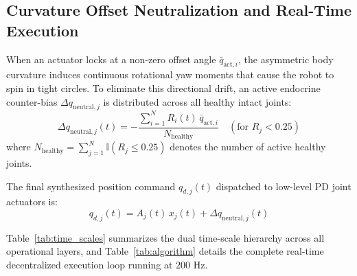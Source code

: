 \documentclass{iopjournal}
\begin{document}
\subsection{Curvature Offset Neutralization and Real-Time Execution}
When an actuator locks at a non-zero offset angle $\bar{q}_{\text{act},i}$, the asymmetric body curvature induces continuous rotational yaw moments that cause the robot to spin in tight circles. To eliminate this directional drift, an active endocrine counter-bias $\Delta q_{\text{neutral},j}$ is distributed across all healthy intact joints:
\begin{equation}
\Delta q_{\text{neutral},j}(t) = -\frac{\sum_{i=1}^N R_i(t)\,\bar{q}_{\text{act},i}}{N_{\text{healthy}}} \quad (\text{for } R_j < 0.25)
\label{eq:yaw_steering}
\end{equation}
where $N_{\text{healthy}} = \sum_{j=1}^N \mathbb{I}(R_j \le 0.25)$ denotes the number of active healthy joints.

The final synthesized position command $q_{d, j}(t)$ dispatched to low-level PD joint actuators is:
\begin{equation}
q_{d, j}(t) = A_j(t)\, x_j(t) + \Delta q_{\text{neutral},j}(t)
\label{eq:final_command}
\end{equation}

Table~\ref{tab:time_scales} summarizes the dual time-scale hierarchy across all operational layers, and Table~\ref{tab:algorithm} details the complete real-time decentralized execution loop running at $200\text{ Hz}$.

\begin{table}[htbp]
\centering
\caption{Dual Time-Scale Modulatory Hierarchy in AHM-CPG Snake Locomotion.}
\label{tab:time_scales}
\end{table}
\end{document}
